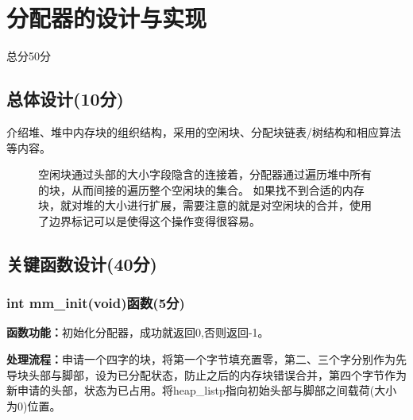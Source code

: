 \section{分配器的设计与实现}
\begin{center}
    总分50分
\end{center}

\subsection{总体设计(10分)}
介绍堆、堆中内存块的组织结构，采用的空闲块、分配块链表/树结构和相应算法等内容。

\begin{figure}[H]
    \begin{minipage}[l]{0.6\linewidth}
        \heiti
    \end{minipage}
    \begin{minipage}[c]{0.4\linewidth}
        \heiti
        空闲块通过头部的大小字段隐含的连接着，分配器通过遍历堆中所有的块，从而间接的遍历整个空闲块的集合。
        如果找不到合适的内存块，就对堆的大小进行扩展，需要注意的就是对空闲块的合并，使用了边界标记可以是使得这个操作变得很容易。
    \end{minipage}
\end{figure}

\subsection{关键函数设计(40分)}
\subsubsection{int mm\_init(void)函数(5分)}
\textbf{函数功能：}初始化分配器，成功就返回0,否则返回-1。

\textbf{处理流程：}申请一个四字的块，将第一个字节填充置零，第二、三个字分别作为先导块头部与脚部，设为已分配状态，防止之后的内存块错误合并，第四个字节作为新申请的头部，状态为已占用。将heap\_listp指向初始头部与脚部之间载荷(大小为0)位置。

